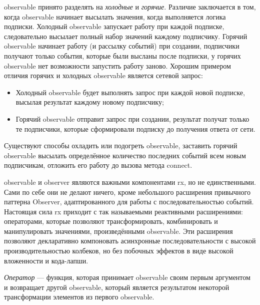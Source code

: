 \gls{observable} принято разделять на \emph{холодные} и \emph{горячие}. Различие заключается в том, когда \gls{observable} начинает высылать значения, когда выполняется логика подписки. Холодный \gls{observable} запускает работу при каждой подписке, следовательно высылает полный набор значений каждому подписчику. Горячий \gls{observable} начинает работу (и рассылку событий) при создании, подписчики получают только события, которые были высланы после подписки, у горячих \gls{observable} нет возможности запустить работу заново. Хорошим примером отличия горячих и холодных \gls{observable} является сетевой запрос:

\begin{itemize}
	\item Холодный \gls{observable} будет выполнять запрос при каждой новой подписке, высылая результат каждому новому подписчику;
	\item Горячий \gls{observable} отправит запрос при создании, результат получат только те подписчики, которые сформировали подписку до получения ответа от сети.
\end{itemize}

Существуют способы охладить или подогреть \gls{observable}, заставить горячий \gls{observable} высылать определённое количество последних событий всем новым подписчикам, отложить его работу до вызова метода connect.

\gls{observable} и observer являются важными компонентами \gls{rx}, но не единственными. Сами по себе они не делают ничего, кроме небольшого расширения привычного паттерна Observer, адаптированного для работы с последовательностью событий. Настоящая сила \gls{rx} приходит с так называемыми реактивными расширениями: операторами, которые позволяют трансформировать, комбинировать и манипулировать значениями, произведёнными \gls{observable}. Эти расширения позволяют декларативно компоновать асинхронные последовательности с высокой производительностью колбеков, но без побочных эффектов в виде высокой вложенности и кода-лапши.

\emph{Оператор} --- функция, которая принимает \gls{observable} своим первым аргументом и возвращает другой \gls{observable}, который является результатом некоторой трансформации элементов из первого \gls{observable}.